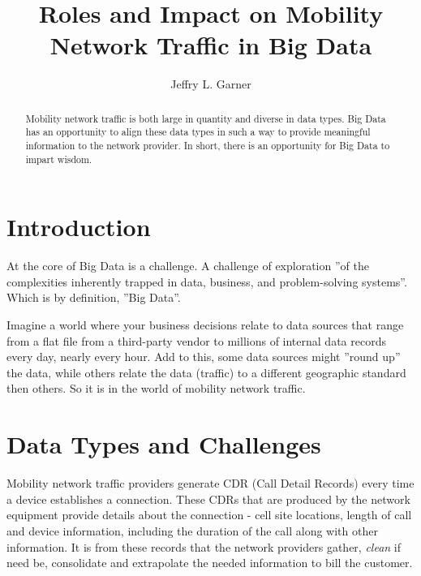 \documentclass[sigconf]{acmart}
\begin{document}
\title{Roles and Impact on Mobility Network Traffic in Big Data}



\author{Jeffry L. Garner}

\begin{abstract}

Mobility network traffic is both large in quantity and diverse in data types.  Big Data has an opportunity to align these data types in such a way to provide meaningful information to the network provider.  In short, there is an opportunity for Big Data to impart wisdom.

\end{abstract}



\maketitle

\section{Introduction}

At the core of Big Data is a challenge.   A challenge of exploration ''of the complexities inherently trapped in data, business, and problem-solving systems''.  \cite{www-cacm-acm-org} Which is by definition, ''Big Data''.

Imagine a world where your business decisions relate to data sources that range from a flat file from a third-party vendor to millions of internal data records every day, nearly every hour.  Add to this, some data sources might ''round up'' the data, while others relate the data (traffic) to a different geographic standard then others.  So it is in the world of mobility network traffic.


\section{Data Types and Challenges}

Mobility network traffic providers generate CDR (Call Detail Records) every time a device establishes a connection.  These CDRs that are produced by the network equipment provide details about the connection - cell site locations, length of call and device information, including the duration of the call along with other information.  It is from these records that the network providers gather, {\em clean} if need be, consolidate and extrapolate the needed information to bill the customer.  
\end{document}
